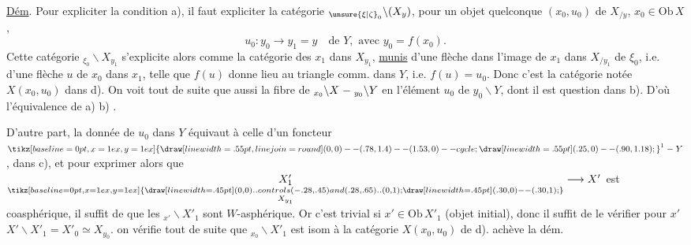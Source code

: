 
\uline{Dém}. Pour expliciter la condition a), il faut   expliciter la catégorie $  {}_{\unsure{\xi|\zeta}_0}\backslash(X_y)$, pour un objet quelconque  $(x_0,u_0)$ de $X_{/y}$,    $x_0\in\mathrm{Ob}\,X$,  \[u_0:y_0\longrightarrow y_1=y\quad\text{de }Y,\text{ avec }y_0=f(x_0).\] Cette catégorie $  {}_{\xi_0}\backslash X_{y_1}$ s'explicite alors comme la catégorie des $x_1$ dans $X_{y_1}$, \uline{munis} d'une flèche  dans  l'image  de $x_1$ dans $X_{/y_1}$ de $\xi_0$, i.e. d'une flèche $u$ de $x_0$ dans $x_1$,  telle que $f(u)$ donne lieu au triangle comm. dans $Y$, i.e. $f(u)=u_0$. Donc c'est la catégorie notée $X(x_0,u_0)$ dans d). On voit tout de suite que   aussi  la fibre de $  {}_{x_0}\backslash X\mathrel{\relbar}{}_{y_0}\backslash Y$ en l'élément $u_0$ de $ {y_0}\backslash Y$, dont il est question dans b). D'où l'équivalence de a) b) .

D'autre part, la donnée de $u_0$ dans $Y$ équivaut à celle d'un foncteur $\mathord{\tikz[baseline=0pt,x=1ex,y=1ex]{\draw[line width=.55pt,line join=round] (0,0)--(.78,1.4)--(1.53,0)--cycle; \draw[line width=.55pt] (.25,0)--(.90,1.18);}}^1\mathrel{\relbar}Y$,  dans c), et pour exprimer alors que $\underset{\substack{\mathord{\tikz[baseline=0pt,x=1ex,y=1ex]{\draw[line width=.45pt] (0,0) .. controls (-.28,.45) and (.28,.65) .. (0,1); \draw[line width=.45pt] (.30,0)--(.30,1);}}\\X_{y_1}}}{X'_1}\longrightarrow X'$ est coasphérique, il suffit de   que les $  {}_{x'}\backslash X'_1$  sont $W$-asphérique. Or c'est trivial si $x'\in\mathrm{Ob}\,X'_1$ (objet initial), donc il suffit de le vérifier pour $x'$ \deleted{$\in$}  $X'\smallsetminus X'_1=X'_0\simeq X_{y_0}$.   on vérifie tout de suite que $  {}_{x_0}\backslash X'_1$ est isom à la catégorie $X(x_0,u_0)$ de d).  achève la dém.

